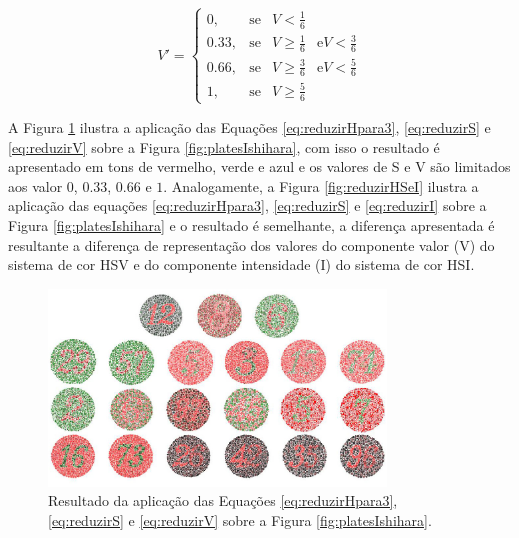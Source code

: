 \documentclass[	12pt, Times, openright, twoside, a4paper, english, brazil]{abntex2}
\begin{document}
\begin{equation}
\label{eq:reduzirV}
V'=\left\{
\begin{array}{rclcl}
       0,   &\mbox{se}  & V <    \frac{1}{6}                                 \\
    0.33,   &\mbox{se}  & V \geq \frac{1}{6} & \mbox{e} V < \frac{3}{6}      \\
    0.66,   &\mbox{se}  & V \geq \frac{3}{6} & \mbox{e} V < \frac{5}{6}      \\
       1,   &\mbox{se}  & V \geq \frac{5}{6}
\end{array}\right.
\end{equation}

A Figura \ref{fig:reduzirHSeV} ilustra a aplicação das Equações \ref{eq:reduzirHpara3}, \ref{eq:reduzirS} e \ref{eq:reduzirV} sobre a Figura \ref{fig:platesIshihara}, com isso o resultado é apresentado em tons de vermelho, verde e azul e os valores de S e V são limitados aos valor $0$, $0.33$, $0.66$ e $1$. Analogamente, a Figura \ref{fig:reduzirHSeI} ilustra a aplicação das equações \ref{eq:reduzirHpara3}, \ref{eq:reduzirS} e \ref{eq:reduzirI} sobre a Figura \ref{fig:platesIshihara} e o resultado é semelhante, a diferença apresentada é resultante a diferença de representação dos valores do componente valor (V) do sistema de cor HSV e do componente intensidade (I) do sistema de cor HSI.

\begin{figure}[!htb]
\centering \includegraphics[width=0.80\textwidth]{figuraDeslocarHSeV.jpg}
\caption{Resultado da aplicação das Equações \ref{eq:reduzirHpara3}, \ref{eq:reduzirS} e \ref{eq:reduzirV} sobre a Figura \ref{fig:platesIshihara}. \label{fig:reduzirHSeV}}
\end{figure}
\end{document}

